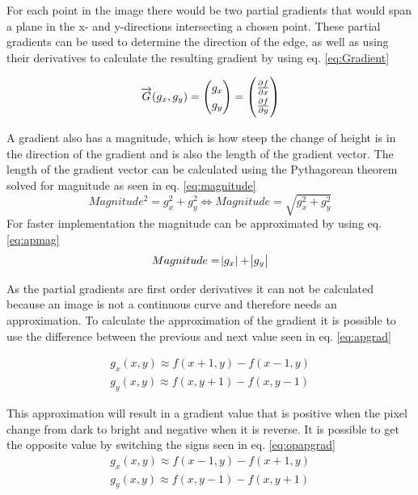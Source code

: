For each point in the image there would be two partial gradients that would span a plane in the x- and y-directions intersecting a chosen point. These partial gradients can be used to determine the direction of the edge, as well as using their derivatives to calculate the resulting gradient by using eq. \ref{eq:Gradient}

\begin{equation} \label{eq:Gradient}
    \overrightarrow{G}(g_x , g_y)=\begin{pmatrix}
    g_x\\[\jot]
    g_y
    \end{pmatrix}=\begin{pmatrix}
    \frac{\partial f}{\partial x}\\[\jot]
    \frac{\partial f}{\partial y}
    \end{pmatrix}
\end{equation}

A gradient also has a magnitude, which is how steep the change of height is in the direction of the gradient and is also the length of the gradient vector. The length of the gradient vector can be calculated using the Pythagorean theorem solved for magnitude as seen in eq. \ref{eq:magnitude}
\begin{equation} \label{eq:magnitude}
    Magnitude^2 = g_x^2 + g_y^2 \Leftrightarrow Magnitude = \sqrt{g_x^2 + g_y^2}
\end{equation}
For faster implementation the magnitude can be approximated by using eq. \ref{eq:apmag}
\begin{equation} \label{eq:apmag}
    Magnitude = \abs{g_x} + \abs{g_y}
\end{equation}

As the partial gradients are first order derivatives it can not be calculated because an image is not a continuous curve and therefore needs an approximation. To calculate the approximation of the gradient it is possible to use the difference between the previous and next value seen in eq. \ref{eq:apgrad}

\begin{subequations}
    \label{eq:apgrad}
    \begin{align}
    g_x(x, y) \approx f(x+1, y) - f(x-1, y) \label{eq:xapgrad} \\
    g_y(x, y) \approx f(x, y+1) - f(x, y-1) \label{eq:yapgrad}
    \end{align}
\end{subequations}

This approximation will result in a gradient value that is positive when the pixel change from dark to bright and negative when it is reverse. It is possible to get the opposite value by switching the signs seen in eq. \ref{eq:opapgrad}
\begin{subequations}
    \label{eq:opapgrad}
    \begin{align}
    g_x(x, y) \approx f(x-1, y) - f(x+1, y) \label{eq:xopapgrad} \\
    g_y(x, y) \approx f(x, y-1) - f(x, y+1) \label{eq:yopapgrad}
    \end{align}
\end{subequations}

